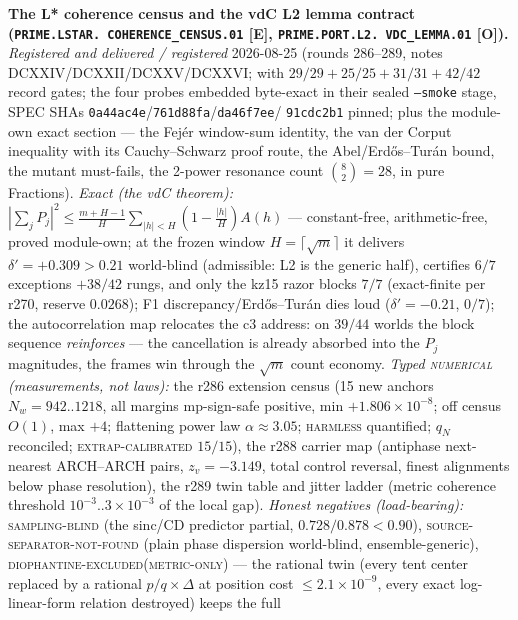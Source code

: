 \documentclass[11pt,a4paper]{article}
\begin{document}
\par\smallskip\noindent\textbf{The L* coherence census and the
vdC L2 lemma contract (\texttt{PRIME.LSTAR.\allowbreak
COHERENCE\_CENSUS.01} [E], \texttt{PRIME.PORT.L2.\allowbreak
VDC\_LEMMA.01} [O]).}
{\sloppy
\emph{Registered and delivered / registered} 2026-08-25 (rounds
286--289, notes DCXXIV/DCXXII/DCXXV/DCXXVI;
 with $29/29 + 25/25 +
31/31 + 42/42$ record gates; the four probes embedded byte-exact
in their sealed \texttt{--smoke} stage, SPEC SHAs
\texttt{0a44ac4e}/\texttt{761d88fa}/\texttt{da46f7ee}/%
\texttt{91cdc2b1} pinned; plus the module-own exact section ---
the Fej\'er window-sum identity, the van der Corput inequality
with its Cauchy--Schwarz proof route, the Abel/Erd\H{o}s--Tur\'an
bound, the mutant must-fails, the 2-power resonance count
$\binom{8}{2} = 28$, in pure Fractions).  \emph{Exact (the vdC
theorem):} $|\sum_j P_j|^2 \le
\frac{m+H-1}{H}\sum_{|h|<H}(1-\frac{|h|}{H})A(h)$ ---
constant-free, arithmetic-free, proved module-own; at the frozen
window $H = \lceil\sqrt{m}\rceil$ it delivers $\delta' = +0.309 >
0.21$ world-blind (admissible: L2 is the generic half), certifies
$6/7$ exceptions $+ 38/42$ rungs, and only the kz15 razor blocks
$7/7$ (exact-finite per r270, reserve $0.0268$); F1
discrepancy/Erd\H{o}s--Tur\'an dies loud ($\delta' = -0.21$,
$0/7$); the autocorrelation map relocates the c3 address: on
$39/44$ worlds the block sequence \emph{reinforces} --- the
cancellation is already absorbed into the $P_j$ magnitudes, the
frames win through the $\sqrt{m}$ count economy.  \emph{Typed
\textsc{numerical} (measurements, not laws):} the r286 extension
census (15 new anchors $N_w = 942..1218$, all margins mp-sign-safe
positive, min $+1.806\times10^{-8}$; off census $O(1)$, max $+4$;
flattening power law $\alpha \approx 3.05$; \textsc{harmless}
quantified; $q_N$ reconciled; \textsc{extrap-calibrated} $15/15$),
the r288 carrier map (antiphase next-nearest ARCH--ARCH pairs,
$z_v = -3.149$, total control reversal, finest alignments below
phase resolution), the r289 twin table and jitter ladder (metric
coherence threshold $10^{-3}..3\times10^{-3}$ of the local gap).
\emph{Honest negatives (load-bearing):}
\textsc{sampling-blind} (the sinc/CD predictor partial,
$0.728/0.878 < 0.90$), \textsc{source-separator-not-found} (plain
phase dispersion world-blind, ensemble-generic),
\textsc{diophantine-excluded}(\textsc{metric-only}) --- the
rational twin (every tent center replaced by a rational $p/q
\times \Delta$ at position cost $\le 2.1\times10^{-9}$, every
exact log-linear-form relation destroyed) keeps the full
}
\end{document}
